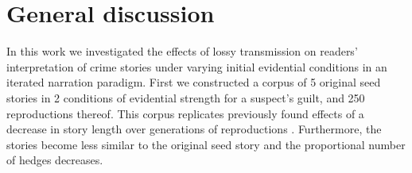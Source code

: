 \documentclass[10pt,letterpaper]{article}
\newcommand{\ek}[1]{\textcolor{Orange}{[ek: #1]}}
\newcommand{\jd}[1]{\textcolor{Green}{[jd: #1]}}
\begin{document}
%


\section{General discussion}

In this work we investigated the effects of lossy transmission on readers' interpretation of crime stories under varying initial evidential conditions in an iterated narration paradigm. First we constructed a corpus of 5 original seed stories in 2 conditions of evidential strength for a suspect's guilt, and 250 reproductions thereof. This corpus replicates previously found effects of a decrease in story length over generations of reproductions \cite{Bartlett:1932}. Furthermore, the stories become less similar to the original seed story and the proportional number of hedges decreases.
\end{document}

